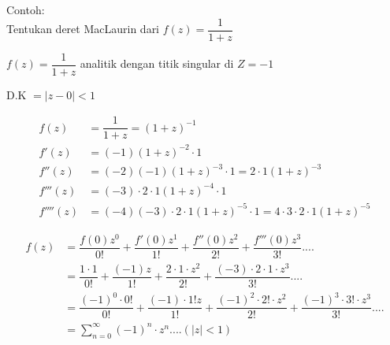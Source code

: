 \documentclass{article}
\begin{document}
Contoh:\\

Tentukan deret MacLaurin dari $f(z)=\dfrac{1}{1+z}$

$f(z)=\dfrac{1}{1+z}$ analitik dengan titik singular di $Z = -1$

D.K $= |z-0|<1$

\begin{align}
    f(z)     & = \dfrac{1}{1+z} = (1+z)^{-1}
    \nonumber                                                                                      \\
    f'(z)    & = (-1)(1+z)^{-2} \cdot 1
    \nonumber                                                                                      \\
    f''(z)   & = (-2)(-1)(1+z)^{-3} \cdot 1 = 2 \cdot 1(1+z)^{-3}
    \nonumber                                                                                      \\
    f'''(z)  & = (-3) \cdot 2 \cdot 1 (1+z)^{-4} \cdot 1
    \nonumber                                                                                      \\
    f''''(z) & = (-4)(-3) \cdot 2 \cdot 1 (1+z)^{-5} \cdot 1 = 4 \cdot 3 \cdot 2 \cdot 1(1+z)^{-5}
    \nonumber
\end{align}

\begin{align}
    f(z) & = \dfrac{f(0)z^0}{0!} + \dfrac{f'(0)z^1}{1!} + \dfrac{f''(0)z^2}{2!} + \dfrac{f'''{(0)z^3}}{3!}....
    \nonumber                                                                                                                                              \\
         & = \dfrac{1 \cdot 1}{0!} + \dfrac{(-1)z}{1!} + \dfrac{ 2 \cdot 1 \cdot z^2}{2!} + \dfrac{(-3) \cdot 2 \cdot 1 \cdot z^3}{3!}....
    \nonumber                                                                                                                                              \\
         & = \dfrac{(-1)^0 \cdot 0!}{0!} + \dfrac{(-1) \cdot 1! z}{1!} + \dfrac{(-1)^2 \cdot 2! \cdot z^2}{2!} + \dfrac{(-1)^3 \cdot 3! \cdot z^3}{3!}....
    \nonumber                                                                                                                                              \\
         & = \sum_{n=0}^{\infty} (-1)^n \cdot z^n .... (|z|<1)
    \nonumber
\end{align}
\end{document}
